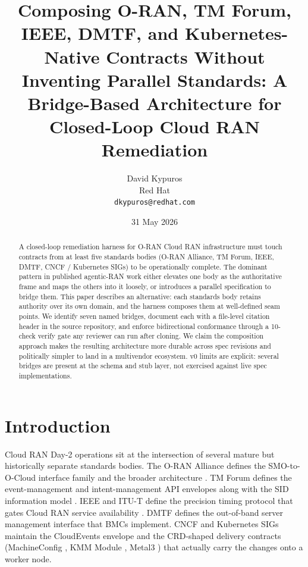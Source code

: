 \documentclass[twocolumn,10pt,a4paper]{article}
\title{Composing O-RAN, TM Forum, IEEE, DMTF, and Kubernetes-Native Contracts Without Inventing Parallel Standards: A Bridge-Based Architecture for Closed-Loop Cloud RAN Remediation}
\author{David Kypuros \\
\small Red Hat \\
\small \texttt{dkypuros@redhat.com}}
\date{31 May 2026}
\begin{document}
\maketitle

\begin{abstract}
A closed-loop remediation harness for O-RAN Cloud RAN infrastructure must touch contracts from at least five standards bodies (O-RAN Alliance, TM Forum, IEEE, DMTF, CNCF / Kubernetes SIGs) to be operationally complete. The dominant pattern in published agentic-RAN work either elevates one body as the authoritative frame and maps the others into it loosely, or introduces a parallel specification to bridge them. This paper describes an alternative: each standards body retains authority over its own domain, and the harness composes them at well-defined seam points. We identify seven named bridges, document each with a file-level citation header in the source repository, and enforce bidirectional conformance through a 10-check verify gate any reviewer can run after cloning. We claim the composition approach makes the resulting architecture more durable across spec revisions and politically simpler to land in a multivendor ecosystem. v0 limits are explicit: several bridges are present at the schema and stub layer, not exercised against live spec implementations.
\end{abstract}

\section{Introduction}

Cloud RAN Day-2 operations sit at the intersection of several mature but historically separate standards bodies. The O-RAN Alliance defines the SMO-to-O-Cloud interface family \cite{oran_o2_ganp,oran_o2_ims,oran_o2_dms} and the broader architecture \cite{oran_wg1_arch}. TM Forum defines the event-management and intent-management API envelopes \cite{tmf688,tmf921} along with the SID information model \cite{tmf_gb922}. IEEE and ITU-T define the precision timing protocol that gates Cloud RAN service availability \cite{ieee_1588_2019,itu_g82751}. DMTF defines the out-of-band server management interface \cite{dmtf_redfish} that BMCs implement. CNCF and Kubernetes SIGs maintain the CloudEvents envelope \cite{cncf_cloudevents} and the CRD-shaped delivery contracts (MachineConfig \cite{openshift_mco}, KMM Module \cite{kmm_operator}, Metal3 \cite{metal3_project,metal3_bmo}) that actually carry the changes onto a worker node.
\end{document}
